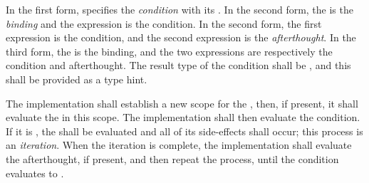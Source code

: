 \specsubsubitem
In the first form,  specifies the \textit{condition}
with its . In the second form, the
 is the \textit{binding} and the expression is the
condition. In the second form, the first expression is the condition, and the
second expression is the \textit{afterthought}. In the third form, the
 is the binding, and the two expressions are
respectively the condition and afterthought. The result type of the condition
shall be , and this shall be provided as a type hint.

\specsubsubitem
The implementation shall establish a new scope for the
, then, if present, it shall evaluate the
 in this scope. The implementation shall then evaluate the
condition. If it is , the  shall be
evaluated and all of its side-effects shall occur; this process is an
\textit{iteration}. When the iteration is complete, the implementation shall
evaluate the afterthought, if present, and then repeat the process, until the
condition evaluates to .


\begin{grammar}
 \\
	 \terminal{(}  \terminal{)} \terminal{\{}  \terminal{\}} \\

 \\
	 \terminal{;} \\
	 \terminal{;}  \\

 \\
	  \terminal{=>}  \\
	 \terminal{=>}  \\

 \\
	 \optional{\terminal{,}} \\
	 \terminal{,}  \\
\end{grammar}

